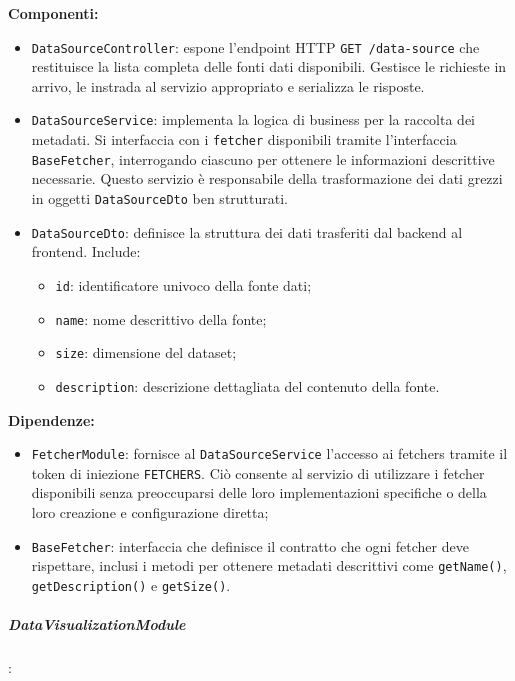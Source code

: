 \textbf{Componenti:}
\begin{itemize}
    \item \texttt{DataSourceController}: espone l'endpoint HTTP \texttt{GET /data-source} che restituisce la lista completa delle fonti dati disponibili. Gestisce le richieste in arrivo, le instrada al servizio appropriato e serializza le risposte.
    
    \item \texttt{DataSourceService}: implementa la logica di business per la raccolta dei metadati. Si interfaccia con i \texttt{fetcher} disponibili tramite l'interfaccia \texttt{BaseFetcher}, interrogando ciascuno per ottenere le informazioni descrittive necessarie. Questo servizio è responsabile della trasformazione dei dati grezzi in oggetti \texttt{DataSourceDto} ben strutturati.
    
    \item \texttt{DataSourceDto}: definisce la struttura dei dati trasferiti dal backend al frontend. Include:
    \begin{itemize}
        \item \texttt{id}: identificatore univoco della fonte dati;
        \item \texttt{name}: nome descrittivo della fonte;
        \item \texttt{size}: dimensione del dataset;
        \item \texttt{description}: descrizione dettagliata del contenuto della fonte.
    \end{itemize}
\end{itemize}

\textbf{Dipendenze:}
\begin{itemize}
    \item \texttt{FetcherModule}: fornisce al \texttt{DataSourceService} l'accesso ai fetchers tramite il token di iniezione \texttt{FETCHERS}. Ciò consente al servizio di utilizzare i fetcher disponibili senza preoccuparsi delle loro implementazioni specifiche o della loro creazione e configurazione diretta;
    \item \texttt{BaseFetcher}: interfaccia che definisce il contratto che ogni fetcher deve rispettare, inclusi i metodi per ottenere metadati descrittivi come \texttt{getName()}, \texttt{getDescription()} e \texttt{getSize()}.
\end{itemize}

\subparagraph{DataVisualizationModule}:

